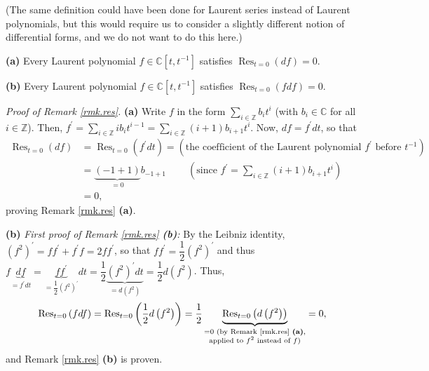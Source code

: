\documentclass[etingof-lie.tex]{subfiles}
\begin{document}
(The same definition could have been done for Laurent series instead of
Laurent polynomials, but this would require us to consider a slightly
different notion of differential forms, and we do not want to do this here.)

\begin{remark}
\label{rmk.res}\textbf{(a)} Every Laurent polynomial $f\in\mathbb{C}\left[
t,t^{-1}\right]  $ satisfies $\operatorname*{Res}\nolimits_{t=0}\left(
df\right)  =0$.

\textbf{(b)} Every Laurent polynomial $f\in\mathbb{C}\left[  t,t^{-1}\right]
$ satisfies $\operatorname*{Res}\nolimits_{t=0}\left(  fdf\right)  =0$.
\end{remark}

\textit{Proof of Remark \ref{rmk.res}.} \textbf{(a)} Write $f$ in the form
$\sum\limits_{i\in\mathbb{Z}}b_{i}t^{i}$ (with $b_{i}\in\mathbb{C}$ for all
$i\in\mathbb{Z}$). Then, $f^{\prime}=\sum\limits_{i\in\mathbb{Z}}ib_{i}%
t^{i-1}=\sum\limits_{i\in\mathbb{Z}}\left(  i+1\right)  b_{i+1}t^{i}$. Now,
$df=f^{\prime}dt$, so that
\begin{align*}
\operatorname*{Res}\nolimits_{t=0}\left(  df\right)   &  =\operatorname*{Res}%
\nolimits_{t=0}\left(  f^{\prime}dt\right)  =\left(  \text{the coefficient of
the Laurent polynomial }f^{\prime}\text{ before }t^{-1}\right) \\
&  =\underbrace{\left(  -1+1\right)  }_{=0}b_{-1+1}\ \ \ \ \ \ \ \ \ \ \left(
\text{since }f^{\prime}=\sum\limits_{i\in\mathbb{Z}}\left(  i+1\right)
b_{i+1}t^{i}\right) \\
&  =0,
\end{align*}
proving Remark \ref{rmk.res} \textbf{(a)}.

\textbf{(b)} \textit{First proof of Remark \ref{rmk.res} \textbf{(b)}:} By the
Leibniz identity, $\left(  f^{2}\right)  ^{\prime}=ff^{\prime}+f^{\prime
}f=2ff^{\prime}$, so that $ff^{\prime}=\dfrac{1}{2}\left(  f^{2}\right)
^{\prime}$ and thus $f\underbrace{df}_{=f^{\prime}dt}=\underbrace{ff^{\prime}%
}_{=\dfrac{1}{2}\left(  f^{2}\right)  ^{\prime}}dt=\dfrac{1}{2}%
\underbrace{\left(  f^{2}\right)  ^{\prime}dt}_{=d\left(  f^{2}\right)
}=\dfrac{1}{2}d\left(  f^{2}\right)  $. Thus,
\[
\operatorname*{Res}\nolimits_{t=0}\left(  fdf\right)  =\operatorname*{Res}%
\nolimits_{t=0}\left(  \dfrac{1}{2}d\left(  f^{2}\right)  \right)  =\dfrac
{1}{2}\underbrace{\operatorname*{Res}\nolimits_{t=0}\left(  d\left(
f^{2}\right)  \right)  }_{\substack{=0\text{ (by Remark \ref{rmk.res}
\textbf{(a)},}\\\text{applied to }f^{2}\text{ instead of }f\text{)}}}=0,
\]
and Remark \ref{rmk.res} \textbf{(b)} is proven.
\end{document}
